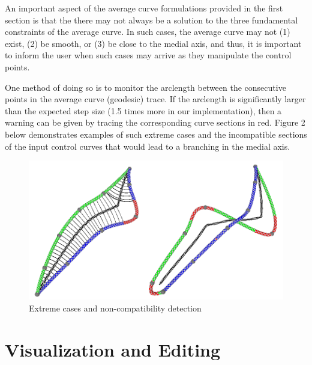 \documentclass[journal, letterpaper]{IEEEtran}
\begin{document}
An important aspect of the average curve formulations provided in the first section is that the 
there may not always be a solution to the three fundamental constraints of the average curve.
In such cases, the average curve may not (1) exist, (2) be smooth, or (3) be close to the medial axis,
and thus, it is important to inform the user when such cases may arrive as they manipulate the control points.

One method of doing so is to monitor the arclength between the consecutive points in the average curve (geodesic)
trace. If the arclength is significantly larger than the expected step size (1.5 times more in our implementation), 
then a warning can be given by tracing the corresponding curve sections in red. Figure 2 below demonstrates
examples of such extreme cases and the incompatible sections of the input control curves that would lead to a branching
in the medial axis. 

\begin{figure}[ht!]
  \includegraphics[width=1.0\linewidth]{images/Result45.png}
	\caption{Extreme cases and non-compatibility detection}
	\label{fig:Result4}
\end{figure}

\newpage
\section{Visualization and Editing}\label{chapter:Visual}
\end{document}
